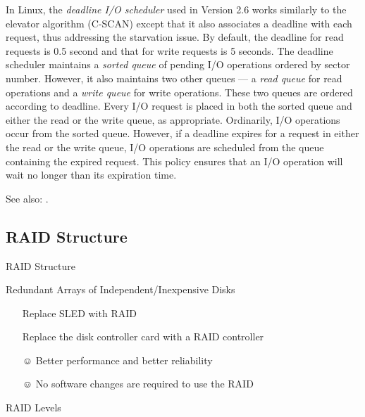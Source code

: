 In Linux, the \emph{deadline I/O scheduler} used in Version 2.6 works similarly to the
elevator algorithm (C-SCAN) except that it also associates a deadline with each request,
thus addressing the starvation issue. By default, the deadline for read requests is 0.5
second and that for write requests is 5 seconds. The deadline scheduler maintains a
\emph{sorted queue} of pending I/O operations ordered by sector number. However, it also
maintains two other queues --- a \emph{read queue} for read operations and a
\emph{write queue} for write operations. These two queues are ordered according to
deadline. Every I/O request is placed in both the sorted queue and either the read or the
write queue, as appropriate. Ordinarily, I/O operations occur from the sorted
queue. However, if a deadline expires for a request in either the read or the write queue,
I/O operations are scheduled from the queue containing the expired request. This policy
ensures that an I/O operation will wait no longer than its expiration
time.

See also: .

\subsection{RAID Structure}

\begin{frame}{RAID Structure}
  \begin{block}{Redundant Arrays of Independent/Inexpensive Disks}
    \begin{itemize}
    \item[\PackingWaste] Replace SLED with RAID
    \item[\PackingWaste] Replace the disk controller card with a RAID controller
    \item[☺] Better performance and better reliability
    \item[☺] No software changes are required to use the RAID
    \end{itemize}
  \end{block}
\end{frame}

\begin{frame}{RAID Levels}
  \begin{center}
     
  \end{center}
\end{frame}


